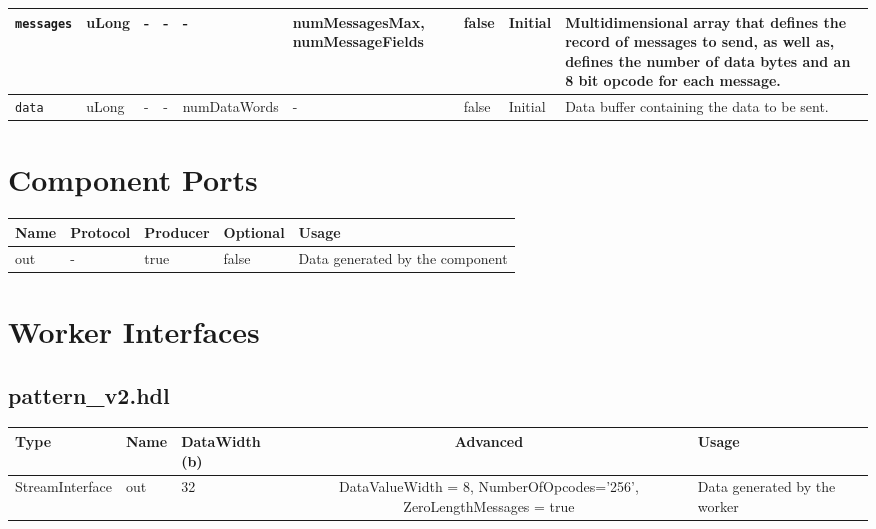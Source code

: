 \documentclass{article}
\def\comp{pattern\_v2}
\begin{document}
\begin{landscape}
\begin{flushleft}
\begin{scriptsize}
\begin{tabular}{|p{2.5cm}|p{1cm}|p{1.5cm}|p{2cm}|p{2cm}|p{2.5cm}|p{1.5cm}|p{1.5cm}|p{5.5cm}|}
                \hline
                \verb+messages+ & uLong & - & - & - & numMessagesMax, numMessageFields & false & Initial & Multidimensional array that defines the record of messages to send, as well as, defines the number of data bytes and an 8 bit opcode for each message.\\
                \hline
                \verb+data+ & uLong & - & - & numDataWords & - & false & Initial & Data buffer containing the data to be sent.\\
                \hline
        \end{tabular}
        \end{scriptsize}


\end{flushleft}


\section*{Component Ports}

        \begin{scriptsize}
                \begin{tabular}{|M{2.5cm}|M{2cm}|M{2cm}|M{2.5cm}|M{12.5cm}|}
                        \hline
                        Name & Protocol & Producer & Optional & Usage\\
                        \hline
                        out
                        & -
                        & true
                        & false
                        & Data generated by the component \\
                        \hline
                \end{tabular}
			\end{scriptsize}

\section*{Worker Interfaces}
\subsection*{\comp.hdl}
\begin{scriptsize}
\begin{tabular}{|M{2.5cm}|M{2.5cm}|M{3.5cm}|c|M{3.5cm}|M{3.5cm}|}
            \hline
            Type    & Name & DataWidth (b) & Advanced  & Usage     \\
            \hline
            StreamInterface & out   & 32  & DataValueWidth = 8, NumberOfOpcodes='256', ZeroLengthMessages = true  & Data generated by the worker \\
           \hline
\end{tabular}
\end{scriptsize}
\end{landscape}
\end{document}

